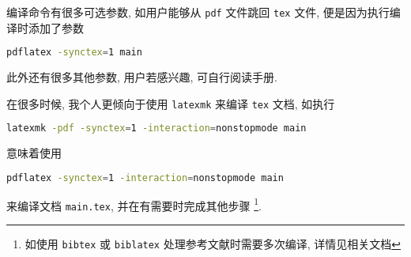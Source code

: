 编译命令有很多可选参数, 如用户能够从 \texttt{pdf} 文件跳回 \texttt{tex} 文件,
便是因为执行编译时添加了参数
\begin{lstlisting}[language=bash]
  pdflatex -synctex=1 main
\end{lstlisting}
此外还有很多其他参数, 用户若感兴趣, 可自行阅读手册. 

在很多时候, 我个人更倾向于使用 \texttt{latexmk} 来编译 \texttt{tex} 文档,
如执行
\begin{lstlisting}[language=bash]
  latexmk -pdf -synctex=1 -interaction=nonstopmode main
\end{lstlisting}
意味着使用 
\begin{lstlisting}[language=bash]
  pdflatex -synctex=1 -interaction=nonstopmode main
\end{lstlisting}
来编译文档 \texttt{main.tex}, 并在有需要时完成其他步骤%
\footnote{如使用 \texttt{bibtex} 或 \texttt{biblatex} 处理参考文献时需要多次编译,
详情见相关文档}. 
